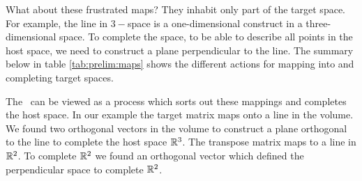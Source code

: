 What about these frustrated maps? They inhabit only part of the target space. For example, the line in $3-$space is a one-dimensional construct in a three-dimensional space. To complete the space, to be able to describe all points in the host space, we need to construct a plane perpendicular to the line. The summary below in table \eqref{tab:prelim:maps} shows the different actions for mapping into and completing target spaces.
\begin{table}[htdp]
\begin{center}
\end{center}
\label{tab:prelim:maps}
\caption{A summary of mapping actions. Matrices can be viewed as maps between an input domain and an output codomain. Here are the possible choices for the smallest matrices. Notice that it is not possible to map to a higher dimensional object. If there is a rank deficiency in the row space then the completion space will be nontrivial. The \svdl \ forces resolution of these mappings for a matrix and its transpose.}
\end{table}%


The \svdl \ can be viewed as a process which sorts out these mappings and completes the host space. In our example the target matrix maps onto a line in the volume. We found two orthogonal vectors in the volume to construct a plane orthogonal to the line to complete the host space $\mathbb{R}^{3}$. The transpose matrix maps to a line in $\mathbb{R}^{2}$. To complete $\mathbb{R}^{2}$ we found an orthogonal vector which defined the perpendicular space to complete $\mathbb{R}^{2}$. 

\endinput
